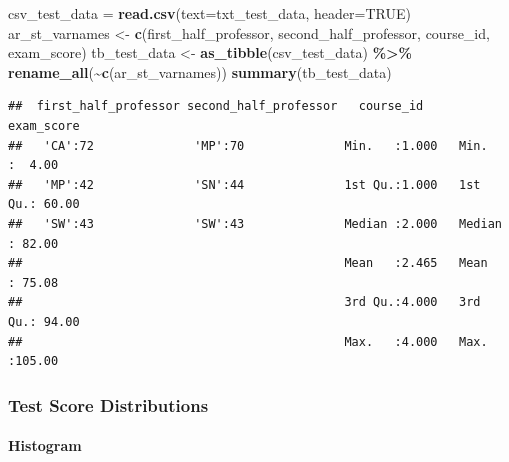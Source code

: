 \documentclass[
]{book}
\newenvironment{Shaded}{\begin{snugshade}}{\end{snugshade}}
\newcommand{\DataTypeTok}[1]{\textcolor[rgb]{0.13,0.29,0.53}{#1}}
\newcommand{\KeywordTok}[1]{\textcolor[rgb]{0.13,0.29,0.53}{\textbf{#1}}}
\newcommand{\NormalTok}[1]{#1}
\newcommand{\OperatorTok}[1]{\textcolor[rgb]{0.81,0.36,0.00}{\textbf{#1}}}
\newcommand{\OtherTok}[1]{\textcolor[rgb]{0.56,0.35,0.01}{#1}}
\newcommand{\StringTok}[1]{\textcolor[rgb]{0.31,0.60,0.02}{#1}}
\begin{document}
\begin{Shaded}
\begin{Highlighting}[]
\NormalTok{csv\_test\_data =}\StringTok{ }\KeywordTok{read.csv}\NormalTok{(}\DataTypeTok{text=}\NormalTok{txt\_test\_data, }\DataTypeTok{header=}\OtherTok{TRUE}\NormalTok{)}
\NormalTok{ar\_st\_varnames \textless{}{-}}\StringTok{ }\KeywordTok{c}\NormalTok{(}\StringTok{\textquotesingle{}first\_half\_professor\textquotesingle{}}\NormalTok{,}
                    \StringTok{\textquotesingle{}second\_half\_professor\textquotesingle{}}\NormalTok{,}
                    \StringTok{\textquotesingle{}course\_id\textquotesingle{}}\NormalTok{, }\StringTok{\textquotesingle{}exam\_score\textquotesingle{}}\NormalTok{)}
\NormalTok{tb\_test\_data \textless{}{-}}\StringTok{ }\KeywordTok{as\_tibble}\NormalTok{(csv\_test\_data) }\OperatorTok{\%\textgreater{}\%}\StringTok{ }
\StringTok{  }\KeywordTok{rename\_all}\NormalTok{(}\OperatorTok{\textasciitilde{}}\KeywordTok{c}\NormalTok{(ar\_st\_varnames))}
\KeywordTok{summary}\NormalTok{(tb\_test\_data)}
\end{Highlighting}
\end{Shaded}

\begin{verbatim}
##  first_half_professor second_half_professor   course_id       exam_score    
##   'CA':72              'MP':70              Min.   :1.000   Min.   :  4.00  
##   'MP':42              'SN':44              1st Qu.:1.000   1st Qu.: 60.00  
##   'SW':43              'SW':43              Median :2.000   Median : 82.00  
##                                             Mean   :2.465   Mean   : 75.08  
##                                             3rd Qu.:4.000   3rd Qu.: 94.00  
##                                             Max.   :4.000   Max.   :105.00
\end{verbatim}

\hypertarget{test-score-distributions}{%
\subsubsection{Test Score Distributions}\label{test-score-distributions}}

\hypertarget{histogram-1}{%
\paragraph{Histogram}\label{histogram-1}}
\end{document}
